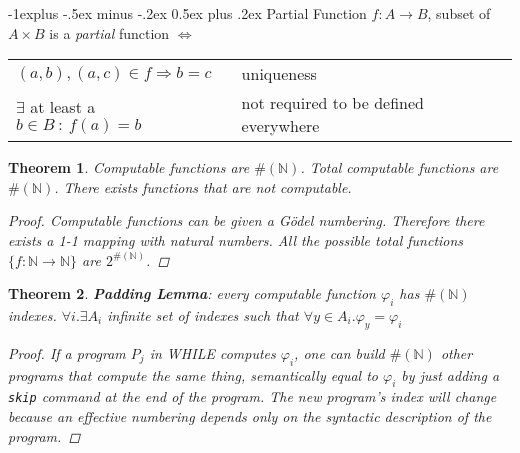 \documentclass[10pt,landscape]{article}
\makeatletter
\newcommand{\impl}{\Rightarrow}
\newcommand{\conv}{\downarrow}
\newcommand{\dive}{\uparrow}
\newcommand{\N}{\mathbb{N}}
\renewcommand{\iff}{\Leftrightarrow}
\theoremstyle{plain}%
\newtheorem*{thm}{Theorem}
\theoremstyle{definition}
\theoremstyle{remark}
\renewcommand{\subsection}{\@startsection{subsection}{2}{0mm}%
                                {-1explus -.5ex minus -.2ex}%
                                {0.5ex plus .2ex}%
                                {\normalfont\normalsize\bfseries}}
\makeatother
\begin{document}
\begin{multicols}{3}
\subsection{Partial Function}
$f : A \to B$, subset of $A \times B$ is a \textit{partial} function $\iff$
\begin{tabular}{@{}ll@{}}
$(a,b),(a,c) \in f \impl b = c$ & uniqueness \\
$\exists$ at least a $b \in B \ : \ f(a) = b$ & not required to be defined everywhere
\end{tabular}
\begin{thm}
    Computable functions are $\#(\N)$. Total computable functions are $\#(\N)$. There exists 
    functions that are not computable.

    \begin{proof}
        Computable functions can be given a Gödel numbering. Therefore there exists a 1-1 mapping with
        natural numbers. All the possible total functions $\{f: \N \to \N \}$ are $2^{\#(\N)}$.
    \end{proof}
\end{thm}


\begin{thm}
    \textbf{Padding Lemma}: every computable function $\varphi_i$ has $\#(\N)$ indexes.
    $\forall i . \exists A_i $ infinite set of indexes such that $\forall y \in A_i. \varphi_y = \varphi_i$

    \begin{proof}
        If a program $P_j$ in WHILE computes $\varphi_i$, one can build 
        $\#(\N)$ other programs that compute the same thing, semantically equal to
        $\varphi_i$ by just adding a \texttt{skip} command at the end of the program.
        The new program's index will change because an effective numbering depends only 
        on the syntactic description of the program.  
    \end{proof}
\end{thm}


\



\end{multicols}
\end{document}
